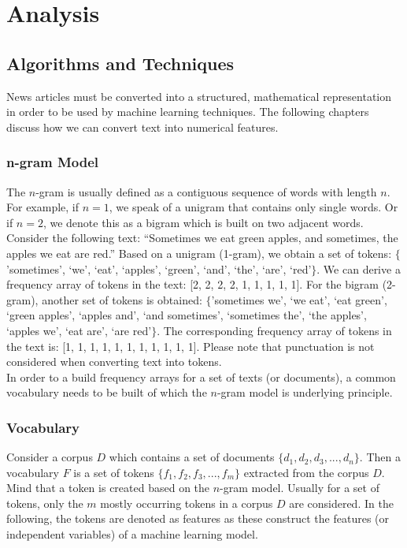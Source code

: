 \documentclass[a4paper,12pt,nottoc]{article}
\begin{document}
\section{Analysis}

\subsection{Algorithms and Techniques}

News articles must be converted into a structured, mathematical representation in order to be used by machine learning techniques. The following chapters discuss how we can convert text into numerical features.

\subsubsection{n-gram Model}

The $n$-gram is usually defined as a contiguous sequence of words with length $n$. For example, if $n = 1$, we speak of a unigram that contains only single words. Or if $n = 2$, we denote this as a bigram which is built on two adjacent words.\\

\noindent Consider the following text: ``Sometimes we eat green apples, and sometimes, the apples we eat are red.'' Based on a unigram (1-gram), we obtain a set of tokens: $\{$'sometimes', `we', `eat', `apples', `green', `and', `the', `are', `red'$\}$. We can derive a frequency array of tokens in the text: [2, 2, 2, 2, 1, 1, 1, 1, 1]. For the bigram (2-gram), another set of tokens is obtained: $\{$'sometimes we', `we eat', `eat green', `green apples', `apples and', `and sometimes', `sometimes the', `the apples', `apples we', `eat are', `are red'$\}$. The corresponding frequency array of tokens in the text is: [1, 1, 1, 1, 1, 1, 1, 1, 1, 1, 1]. Please note that punctuation is not considered when converting text into tokens.\\

\noindent In order to a build frequency arrays for a set of texts (or documents), a common vocabulary needs to be built of which the $n$-gram model is underlying principle.

\clearpage
\subsubsection{Vocabulary}

Consider a corpus $D$ which contains a set of documents $\{d_1, d_2, d_3, ..., d_n\}$. Then a vocabulary $F$ is a set of tokens $\{f_1, f_2, f_3, ..., f_m\}$ extracted from the corpus $D$. Mind that a token is created based on the $n$-gram model. Usually for a set of tokens, only the $m$ mostly occurring tokens in a corpus $D$ are considered. In the following, the tokens are denoted as features as these construct the features (or independent variables) of a machine learning model.\\
\end{document}
